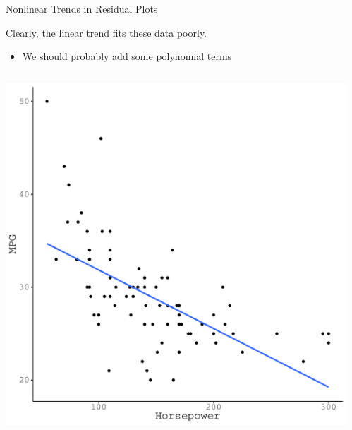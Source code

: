 \documentclass{beamer}\usepackage[]{graphicx}\usepackage[]{color}
\makeatletter
\def\maxwidth{ %
  \ifdim\Gin@nat@width>\linewidth
    \linewidth
  \else
    \Gin@nat@width
  \fi
}
\newenvironment{knitrout}{}{} %
\makeatother
\begin{document}
\begin{frame}{Nonlinear Trends in Residual Plots}

  Clearly, the linear trend fits these data poorly.
  \begin{itemize}
    \item We should probably add some polynomial terms
  \end{itemize}
  \vb
  \begin{columns}
    \begin{column}{0.5\textwidth}
      
\begin{knitrout}\footnotesize
{}\color{fgcolor}

{\centering \includegraphics[width=\maxwidth]{figure/unnamed-chunk-14-1} 

}



\end{knitrout}

\end{column}

\begin{column}{0.5\textwidth}
      
\begin{knitrout}\footnotesize
{}\color{fgcolor}


\end{knitrout}
\end{column}
\end{columns}
\end{frame}
\end{document}
